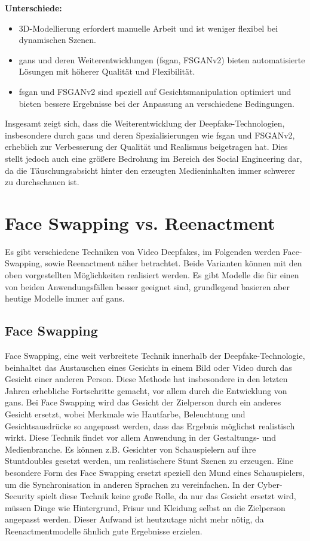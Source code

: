 \textbf{Unterschiede:}
\begin{itemize}
    \item 3D-Modellierung erfordert manuelle Arbeit und ist weniger flexibel bei dynamischen Szenen.
    \item \glspl{gan} und deren Weiterentwicklungen (\gls{fsgan}, FSGANv2) bieten automatisierte Lösungen mit höherer Qualität und Flexibilität.
    \item \gls{fsgan} und FSGANv2 sind speziell auf Gesichtsmanipulation optimiert und bieten bessere Ergebnisse bei der Anpassung an verschiedene Bedingungen\cite{Deepfakes-a-survey-and-introduction-to-the-topical-collection}.
\end{itemize}

Insgesamt zeigt sich, dass die Weiterentwicklung der Deepfake-Technologien, insbesondere durch \glspl{gan} und deren Spezialisierungen wie \gls{fsgan} und FSGANv2, erheblich zur Verbesserung der Qualität und Realismus beigetragen hat.
Dies stellt jedoch auch eine größere Bedrohung im Bereich des Social Engineering dar, da die Täuschungsabsicht hinter den erzeugten Medieninhalten immer schwerer zu durchschauen ist.

\section{Face Swapping vs. Reenactment}\label{sec:face-swapping-vs.-reenactment}
Es gibt verschiedene Techniken von Video Deepfakes, im Folgenden werden Face-Swapping, sowie Reenactment näher betrachtet.
Beide Varianten können mit den oben vorgestellten Möglichkeiten realisiert werden.
Es gibt Modelle die für einen von beiden Anwendungsfällen besser geeignet sind, grundlegend basieren aber heutige Modelle immer auf \glspl{gan}.

\subsection{Face Swapping}\label{subsec:face-swapping}
Face Swapping, eine weit verbreitete Technik innerhalb der Deepfake-Technologie, beinhaltet das Austauschen eines
Gesichts in einem Bild oder Video durch das Gesicht einer anderen Person.
Diese Methode hat insbesondere in den letzten Jahren erhebliche Fortschritte gemacht, vor allem durch die Entwicklung von \glspl{gan}.
Bei Face Swapping wird das Gesicht der Zielperson durch ein anderes Gesicht ersetzt, wobei Merkmale wie Hautfarbe,
Beleuchtung und Gesichtsausdrücke so angepasst werden, dass das Ergebnis möglichst realistisch wirkt.
Diese Technik findet vor allem Anwendung in der Gestaltungs- und Medienbranche.
Es können z.B. Gesichter von Schauspielern auf ihre Stuntdoubles gesetzt werden, um realistischere Stunt Szenen zu erzeugen.
Eine besondere Form des Face Swapping ersetzt speziell den Mund eines Schauspielers, um die Synchronisation in anderen Sprachen zu vereinfachen\cite{Deepfakes-An-Overview}.
In der Cyber-Security spielt diese Technik keine große Rolle, da nur das Gesicht ersetzt wird, müssen Dinge wie Hintergrund, Frisur und Kleidung selbst an die Zielperson angepasst werden.
Dieser Aufwand ist heutzutage nicht mehr nötig, da Reenactmentmodelle ähnlich gute Ergebnisse erzielen.

